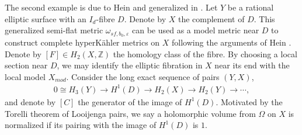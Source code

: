 \documentclass[11pt]{amsart}
\theoremstyle{plain}
\theoremstyle{definition}
\numberwithin{equation}{section}
\renewcommand{\epsilon}{\varepsilon}
\begin{document}
   
   
   The second example is due to Hein \cite{Hein} and generalized in \cite{CJL2}. Let $Y$ be a rational elliptic surface with an $I_d$-fibre $D$. Denote by $X$ the complement of $D$. 
   This generalized semi-flat metric ${\omega}_{sf,b_0,\epsilon}$ can be used as a model metric near ${D}$ to construct complete hyperK\"ahler metrics on ${X}$ following the arguments of Hein \cite{Hein}. Denote by $[F]\in H_2({X},\mathbb{Z})$ the homology class of the fibre. By choosing a local section near ${D}$, we may identify the elliptic fibration in ${X}$ near its end with the local model ${X}_{mod}$. Consider the long exact sequence of pairs $(Y,X)$, 
     \begin{align} \label{eq: les}
     	  0\cong H_3(Y)\rightarrow H^1(D)\rightarrow H_2(X)\rightarrow H_2(Y)\rightarrow \cdots,
     \end{align} and denote by $[C]$ the generator of the image of $H^1(D)$. Motivated by the Torelli theorem of Looijenga pairs, we say a holomorphic volume from $\Omega$ on $X$ is normalized if its pairing with the image of $H^1(D)$ is $1$. 
\end{document}
